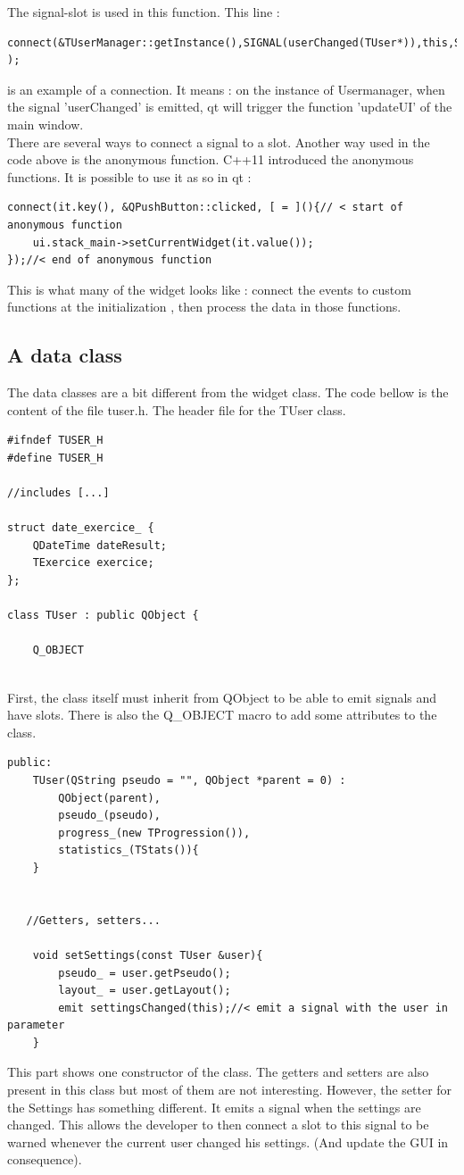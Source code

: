 The signal-slot is used in this function. This line : 
\begin{lstlisting}
connect(&TUserManager::getInstance(),SIGNAL(userChanged(TUser*)),this,SLOT(updateUI(TUser*)) );
\end{lstlisting}
is an example of a connection. It means : on the instance of Usermanager, when the signal 'userChanged' is emitted, qt will trigger the function 'updateUI' of the main window.\\
There are several ways to connect a signal to a slot. Another way used in the code above is the anonymous function. C++11 introduced the anonymous functions. It is possible to use it as so in qt :
\begin{lstlisting}
connect(it.key(), &QPushButton::clicked, [ = ](){// < start of anonymous function
	ui.stack_main->setCurrentWidget(it.value());
});//< end of anonymous function
\end{lstlisting}

This is what many of the widget looks like : connect the events to custom functions at the initialization , then process the data in those functions.

\subsection{A data class}

The data classes are a bit different from the widget class. The code bellow is the content of the file tuser.h. The header file for the TUser class.
\begin{lstlisting}
#ifndef TUSER_H
#define TUSER_H

//includes [...]

struct date_exercice_ {
    QDateTime dateResult;
    TExercice exercice;
};

class TUser : public QObject {

    Q_OBJECT
    
\end{lstlisting}
First, the class itself must inherit from QObject to be able to emit signals and have slots. There is also the Q\_OBJECT macro to add some attributes to the class.

\begin{lstlisting}
public:
    TUser(QString pseudo = "", QObject *parent = 0) :
        QObject(parent),
        pseudo_(pseudo),
        progress_(new TProgression()),
        statistics_(TStats()){
    }


   //Getters, setters...

    void setSettings(const TUser &user){
        pseudo_ = user.getPseudo();
        layout_ = user.getLayout();
        emit settingsChanged(this);//< emit a signal with the user in parameter
    }
\end{lstlisting}
This part shows one constructor of the class. The getters and setters are also present in this class but most of them are not interesting. However, the setter for the Settings has something different. It emits a signal when the settings are changed. This allows the developer to then connect a slot to this signal to be warned whenever the current user changed his settings. (And update the GUI in consequence).



